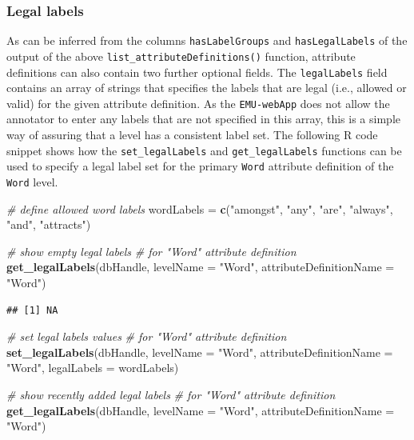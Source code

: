 \documentclass[]{book}
\newenvironment{Shaded}{\begin{snugshade}}{\end{snugshade}}
\newcommand{\CommentTok}[1]{\textcolor[rgb]{0.56,0.35,0.01}{\textit{#1}}}
\newcommand{\DataTypeTok}[1]{\textcolor[rgb]{0.13,0.29,0.53}{#1}}
\newcommand{\KeywordTok}[1]{\textcolor[rgb]{0.13,0.29,0.53}{\textbf{#1}}}
\newcommand{\NormalTok}[1]{#1}
\newcommand{\StringTok}[1]{\textcolor[rgb]{0.31,0.60,0.02}{#1}}
\begin{document}
\hypertarget{subsubsec:emuDBlegalLabels}{%
\subsubsection{Legal labels}\label{subsubsec:emuDBlegalLabels}}

As can be inferred from the columns \texttt{hasLabelGroups} and \texttt{hasLegalLabels} of the output of the above \texttt{list\_attributeDefinitions()} function, attribute definitions can also contain two further optional fields. The \texttt{legalLabels} field contains an array of strings that specifies the labels that are legal (i.e., allowed or valid) for the given attribute definition. As the \texttt{EMU-webApp} does not allow the annotator to enter any labels that are not specified in this array, this is a simple way of assuring that a level has a consistent label set. The following R code snippet shows how the \texttt{set\_legalLabels} and \texttt{get\_legalLabels} functions can be used to specify a legal label set for the primary \texttt{Word} attribute definition of the \texttt{Word} level.

\begin{Shaded}
\begin{Highlighting}[]
\CommentTok{# define allowed word labels}
\NormalTok{wordLabels =}\StringTok{ }\KeywordTok{c}\NormalTok{(}\StringTok{"amongst"}\NormalTok{, }\StringTok{"any"}\NormalTok{, }\StringTok{"are"}\NormalTok{,}
               \StringTok{"always"}\NormalTok{, }\StringTok{"and"}\NormalTok{, }\StringTok{"attracts"}\NormalTok{)}

\CommentTok{# show empty legal labels}
\CommentTok{# for "Word" attribute definition}
\KeywordTok{get_legalLabels}\NormalTok{(dbHandle,}
                \DataTypeTok{levelName =} \StringTok{"Word"}\NormalTok{,}
                \DataTypeTok{attributeDefinitionName =} \StringTok{"Word"}\NormalTok{)}
\end{Highlighting}
\end{Shaded}

\begin{verbatim}
## [1] NA
\end{verbatim}

\begin{Shaded}
\begin{Highlighting}[]
\CommentTok{# set legal labels values}
\CommentTok{# for "Word" attribute definition}
\KeywordTok{set_legalLabels}\NormalTok{(dbHandle,}
                \DataTypeTok{levelName =} \StringTok{"Word"}\NormalTok{,}
                \DataTypeTok{attributeDefinitionName =} \StringTok{"Word"}\NormalTok{,}
                \DataTypeTok{legalLabels =}\NormalTok{ wordLabels)}

\CommentTok{# show recently added legal labels}
\CommentTok{# for "Word" attribute definition}
\KeywordTok{get_legalLabels}\NormalTok{(dbHandle,}
                \DataTypeTok{levelName =} \StringTok{"Word"}\NormalTok{,}
                \DataTypeTok{attributeDefinitionName =} \StringTok{"Word"}\NormalTok{)}
\end{Highlighting}
\end{Shaded}
\end{document}
